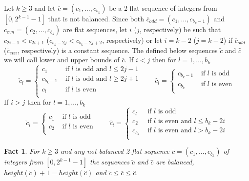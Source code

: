 \documentclass{llncs}
\newtheorem{fact}[theorem]{Fact}
\begin{document}
\begin{definition}\label{def-14}
Let $k\ge 3$ and let $\overline{c} = (c_1,\ldots,c_{b_k})$ be a
2-flat sequence of integers from $[0,2^{k-1}-1]$ that is not balanced.
Since both $\overline{c}_{odd} =(c_1,\ldots,c_{b_k-1})$ and 
$\overline{c}_{evn} =(c_2,\ldots,c_{b_k})$ are 
flat sequences, let $i$ ($j$, respectively) be such that $c_{2i-1} < 
c_{2i+1}$ 
($c_{b_k-2j} < c_{b_k-2j+2}$, respectively) or let $i=k-2$ ($j=k-2$) if 
$\overline{c}_{odd}$ ($\overline{c}_{evn}$, respectively) is a constant 
sequence. The defined below sequences $\check{c}$ and $\hat{c}$ we will call 
lower and upper bounds of $\overline{c}$. If $i < j$ then for $l=1, \ldots, 
b_k$ \[
\check{c}_l = \left\{
\begin{array}{ll}
c_1       & \mbox{ if } l \mbox{ is odd and } l\le 2j-1\\
c_{b_k-1} & \mbox{ if } l \mbox{ is odd and } l\ge 2j+1\\
c_l       & \mbox{ if } l \mbox{ is even}\\
\end{array}
\right. \qquad
\hat{c}_l = \left\{
\begin{array}{ll}
c_{b_k-1} & \mbox{ if } l \mbox{ is odd}\\
c_{b_k}   & \mbox{ if } l \mbox{ is even}\\
\end{array}
\right.\] 
If $i > j$ then for $l=1, \ldots, b_k$ \[
\check{c}_l = \left\{
\begin{array}{ll}
c_1      & \mbox{ if } l \mbox{ is odd}\\
c_2      & \mbox{ if } l \mbox{ is even}\\
\end{array}
\right. \qquad
\hat{c}_l = \left\{
\begin{array}{ll}
c_l       & \mbox{ if } l \mbox{ is odd}\\
c_2       & \mbox{ if } l \mbox{ is even and } l\le b_k-2i\\
c_{b_k}   & \mbox{ if } l \mbox{ is even and } l >  b_k-2i\\
\end{array}
\right.\] 
\end{definition}
\begin{fact}\label{fct-19}
For $k\ge 3$ and any not balanced 2-flat sequence $\overline{c} =
(c_1,\ldots,c_{b_k})$ of integers from $[0,2^{k-1}-1]$ the sequences
$\check{c}$ and $\hat{c}$ are balanced, $height(\check{c})+1 =
height(\hat{c})$ and $\check{c}\le\overline{c}\le\hat{c}$.
\end{fact}
\end{document}
